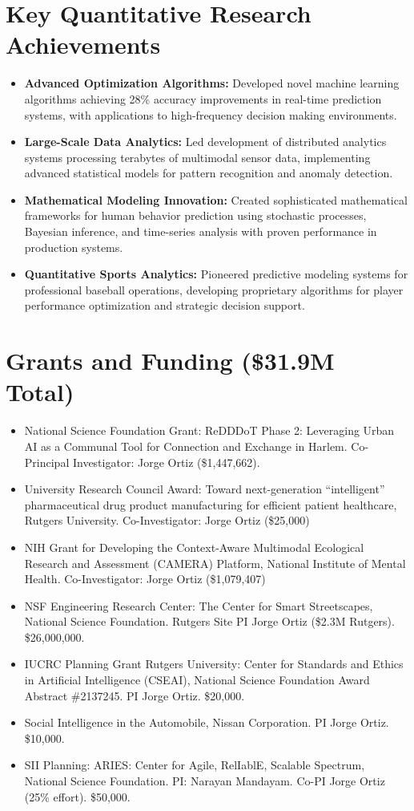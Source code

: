 \documentclass[12pt]{article}
\begin{document}
\section{Key Quantitative Research Achievements}
\begin{itemize}
    \item \textbf{Advanced Optimization Algorithms:} Developed novel machine learning algorithms achieving 28\% accuracy improvements in real-time prediction systems, with applications to high-frequency decision making environments.
    \item \textbf{Large-Scale Data Analytics:} Led development of distributed analytics systems processing terabytes of multimodal sensor data, implementing advanced statistical models for pattern recognition and anomaly detection.
    \item \textbf{Mathematical Modeling Innovation:} Created sophisticated mathematical frameworks for human behavior prediction using stochastic processes, Bayesian inference, and time-series analysis with proven performance in production systems.
    \item \textbf{Quantitative Sports Analytics:} Pioneered predictive modeling systems for professional baseball operations, developing proprietary algorithms for player performance optimization and strategic decision support.
\end{itemize}

\section{Grants and Funding (\$31.9M Total)}
\begin{itemize}
    \item National Science Foundation Grant: ReDDDoT Phase 2: Leveraging Urban AI as a Communal Tool for Connection and Exchange in Harlem. Co-Principal Investigator: Jorge Ortiz (\$1,447,662).
    \item University Research Council Award: Toward next-generation ``intelligent'' pharmaceutical drug product manufacturing for efficient patient healthcare, Rutgers University. Co-Investigator: Jorge Ortiz (\$25,000)
    \item NIH Grant for Developing the Context-Aware Multimodal Ecological Research and Assessment (CAMERA) Platform, National Institute of Mental Health. Co-Investigator: Jorge Ortiz (\$1,079,407)
    \item NSF Engineering Research Center: The Center for Smart Streetscapes, National Science Foundation. Rutgers Site PI Jorge Ortiz (\$2.3M Rutgers). \$26,000,000.
    \item IUCRC Planning Grant Rutgers University: Center for Standards and Ethics in Artificial Intelligence (CSEAI), National Science Foundation Award Abstract \#2137245. PI Jorge Ortiz. \$20,000.
    \item Social Intelligence in the Automobile, Nissan Corporation. PI Jorge Ortiz. \$10,000.
    \item SII Planning: ARIES: Center for Agile, RelIablE, Scalable Spectrum, National Science Foundation. PI: Narayan Mandayam. Co-PI Jorge Ortiz (25\% effort). \$50,000.
\end{itemize}
\end{document}
